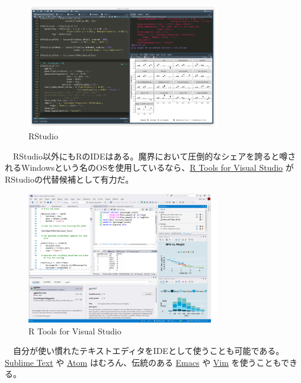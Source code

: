 \documentclass[
  a4paper,
  pandoc,
  ja=standard,
  jafont=haranoaji]{bxjsbook}
\begin{document}
\begin{figure}

{\centering \includegraphics[width=0.75\textwidth,height=\textheight]{./Figs/AboutR/IDE_RStudio.png}

}

\caption{\label{fig-aboutr_rstudio}RStudio}

\end{figure}

　RStudio以外にもRのIDEはある。魔界において圧倒的なシェアを誇ると噂されるWindowsという名のOSを使用しているなら、\href{https://docs.microsoft.com/ja-jp/visualstudio/rtvs/installer?view=vs-2017}{R
Tools for Visual Studio} がRStudioの代替候補として有力だ。

\begin{figure}

{\centering \includegraphics[width=0.75\textwidth,height=\textheight]{./Figs/AboutR/IDE_RTVS.png}

}

\caption{\label{fig-aboutr_rtvs}R Tools for Visual Studio}

\end{figure}

　自分が使い慣れたテキストエディタをIDEとして使うことも可能である。\href{https://www.sublimetext.com}{Sublime
Text} や \href{https://atom.io}{Atom} はむろん、伝統のある
\href{https://www.gnu.org/software/emacs/}{Emacs} や
\href{https://www.vim.org}{Vim} を使うこともできる。
\end{document}
